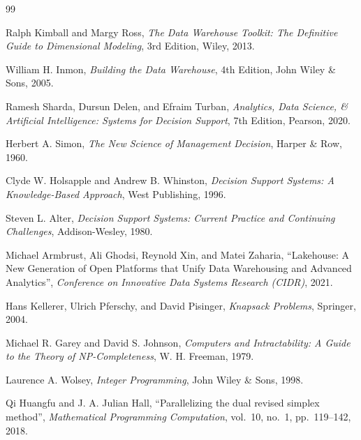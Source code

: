 \documentclass[a4paper,11pt]{article}
\begin{document}
    \newpage
    \renewcommand{\refname}{TÀI LIỆU THAM KHẢO}
    \begin{thebibliography}{99}
        Ralph Kimball and Margy Ross,
        \textit{The Data Warehouse Toolkit: The Definitive Guide to Dimensional Modeling},
        3rd Edition, Wiley, 2013.

        William H. Inmon,
        \textit{Building the Data Warehouse},
        4th Edition, John Wiley \& Sons, 2005.

        Ramesh Sharda, Dursun Delen, and Efraim Turban,
        \textit{Analytics, Data Science, \& Artificial Intelligence: Systems for Decision Support},
        7th Edition, Pearson, 2020.

        Herbert A. Simon,
        \textit{The New Science of Management Decision},
        Harper \& Row, 1960.

        Clyde W. Holsapple and Andrew B. Whinston,
        \textit{Decision Support Systems: A Knowledge-Based Approach},
        West Publishing, 1996.

        Steven L. Alter,
        \textit{Decision Support Systems: Current Practice and Continuing Challenges},
        Addison-Wesley, 1980.

        Michael Armbrust, Ali Ghodsi, Reynold Xin, and Matei Zaharia,
        ``Lakehouse: A New Generation of Open Platforms that Unify Data Warehousing and Advanced Analytics'',
        \textit{Conference on Innovative Data Systems Research (CIDR)}, 2021.

        Hans Kellerer, Ulrich Pferschy, and David Pisinger,
        \textit{Knapsack Problems},
        Springer, 2004.

        Michael R. Garey and David S. Johnson,
        \textit{Computers and Intractability: A Guide to the Theory of NP-Completeness},
        W. H. Freeman, 1979.

        Laurence A. Wolsey,
        \textit{Integer Programming},
        John Wiley \& Sons, 1998.

        Qi Huangfu and J. A. Julian Hall,
        ``Parallelizing the dual revised simplex method'',
        \textit{Mathematical Programming Computation}, vol.~10, no.~1, pp.~119--142, 2018.


\end{thebibliography}
\end{document}
